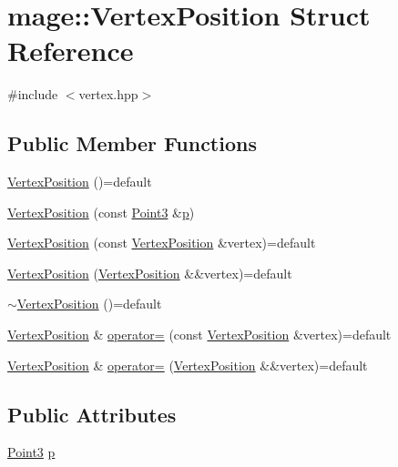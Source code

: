 \hypertarget{structmage_1_1_vertex_position}{}\section{mage\+:\+:Vertex\+Position Struct Reference}
\label{structmage_1_1_vertex_position}


{\ttfamily \#include $<$vertex.\+hpp$>$}

\subsection*{Public Member Functions}
\begin{DoxyCompactItemize}
\item 
\hyperlink{structmage_1_1_vertex_position_a2e6037836e67cdf5c43fc9abfa0d3753}{Vertex\+Position} ()=default
\item 
\hyperlink{structmage_1_1_vertex_position_aca7867e7a2d0cb50f32283dd91bb2aed}{Vertex\+Position} (const \hyperlink{structmage_1_1_point3}{Point3} \&\hyperlink{structmage_1_1_vertex_position_ad9c3ea68e2c1745446387d1eca28f25f}{p})
\item 
\hyperlink{structmage_1_1_vertex_position_aa77211e4b45efed3d57f3170b9df6787}{Vertex\+Position} (const \hyperlink{structmage_1_1_vertex_position}{Vertex\+Position} \&vertex)=default
\item 
\hyperlink{structmage_1_1_vertex_position_ae00cb7667e411fefa4052b80a47ccfff}{Vertex\+Position} (\hyperlink{structmage_1_1_vertex_position}{Vertex\+Position} \&\&vertex)=default
\item 
\hyperlink{structmage_1_1_vertex_position_ae78ac5fd76f3217ec72435beaa34ed6e}{$\sim$\+Vertex\+Position} ()=default
\item 
\hyperlink{structmage_1_1_vertex_position}{Vertex\+Position} \& \hyperlink{structmage_1_1_vertex_position_a07e7df87f6f70556d98c856a47643b73}{operator=} (const \hyperlink{structmage_1_1_vertex_position}{Vertex\+Position} \&vertex)=default
\item 
\hyperlink{structmage_1_1_vertex_position}{Vertex\+Position} \& \hyperlink{structmage_1_1_vertex_position_a37000c522dc4d0078ac879dc46532911}{operator=} (\hyperlink{structmage_1_1_vertex_position}{Vertex\+Position} \&\&vertex)=default
\end{DoxyCompactItemize}
\subsection*{Public Attributes}
\begin{DoxyCompactItemize}
\item 
\hyperlink{structmage_1_1_point3}{Point3} \hyperlink{structmage_1_1_vertex_position_ad9c3ea68e2c1745446387d1eca28f25f}{p}
\end{DoxyCompactItemize}
